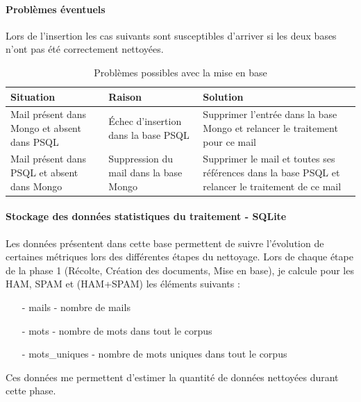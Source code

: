     \paragraph{Problèmes éventuels}
        Lors de l'insertion les cas suivants sont susceptibles d'arriver si les deux bases n'ont pas été correctement nettoyées.\\
        \begin{table}[H]
            \centering
            \begin{tabular}{|p{4cm}|p{4cm}|p{7cm}|}
                \hline
                Situation & Raison & Solution\\
                \hline
                Mail présent dans Mongo et absent dans PSQL & Échec d'insertion dans la base PSQL & Supprimer l'entrée dans la base Mongo et relancer le traitement pour ce mail\\
                \hline
                Mail présent dans PSQL et absent dans Mongo & Suppression du mail dans la base Mongo & Supprimer le mail et toutes ses références dans la base PSQL et relancer le traitement de ce mail\\
                \hline
            \end{tabular}
            \caption{Problèmes possibles avec la mise en base}
            \label{tab:pb-base}
        \end{table}


    \paragraph{Stockage des données statistiques du traitement - SQLite}
        Les données présentent dans cette base permettent de suivre l'évolution de certaines métriques lors des différentes étapes du nettoyage.
        Lors de chaque étape de la phase 1 (Récolte, Création des documents, Mise en base), je calcule pour les HAM, SPAM et (HAM+SPAM) les éléments suivants :
        \begin{itemize}
            \item[-] mails - nombre de mails
            \item[-] mots - nombre de mots dans tout le corpus
            \item[-] mots\_uniques - nombre de mots uniques dans tout le corpus
        \end{itemize}

        Ces données me permettent d'estimer la quantité de données nettoyées durant cette phase.

